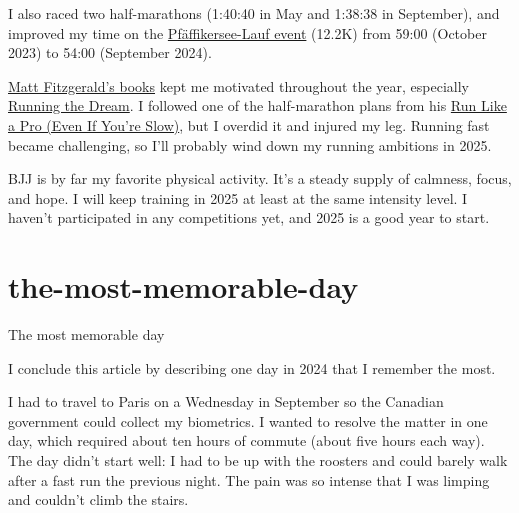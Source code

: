 \documentclass{article}
\begin{document}
\begin{figure}
\end{figure}

I also raced two half-marathons (1:40:40 in May and 1:38:38 in September), and improved my time on the \href{https://www.zuerilaufcup.ch/12-laeufe/pfaeffikersee-lauf}{Pfäffikersee-Lauf event} (12.2K) from 59:00 (October 2023) to 54:00 (September 2024).

\href{https://www.goodreads.com/author/show/99585.Matt_Fitzgerald}{Matt Fitzgerald's books} kept me motivated throughout the year, especially \href{https://www.goodreads.com/book/show/49342140-running-the-dream}{Running the Dream}.
I followed one of the half-marathon plans from his \href{https://www.goodreads.com/book/show/58284094-run-like-a-pro-even-if-you-re-slow}{Run Like a Pro (Even If You’re Slow)}, but I overdid it and injured my leg.
Running fast became challenging, so I'll probably wind down my running ambitions in 2025.

BJJ is by far my favorite physical activity.
It's a steady supply of calmness, focus, and hope.
I will keep training in 2025 at least at the same intensity level.
I haven't participated in any competitions yet, and 2025 is a good year to start.

\begin{figure}[medium-size]
\end{figure}

\section{the-most-memorable-day}{The most memorable day}

I conclude this article by describing one day in 2024 that I remember the most.

I had to travel to Paris on a Wednesday in September so the Canadian government could collect my biometrics.
I wanted to resolve the matter in one day, which required about ten hours of commute (about five hours each way).
The day didn't start well: I had to be up with the roosters and could barely walk after a fast run the previous night.
The pain was so intense that I was limping and couldn’t climb the stairs.
\end{document}
